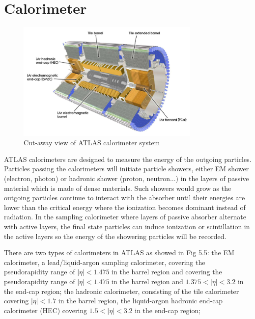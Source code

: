 \section{Calorimeter}
\label{sec:calo}
\begin{figure}[htbp]
 \begin{center}
 \includegraphics[width=0.8\textwidth]{chapters/c4/figures/Calo}
 \end{center}
 \caption{Cut-away view of ATLAS calorimeter system}
 \label{fig:Calo}
\end{figure}
\par ATLAS calorimeters \cite{CERN-LHCC-96-041} are designed to measure the energy of the outgoing particles. 
Particles passing the calorimeters will initiate particle showers, either EM shower (electron, photon) or hadronic shower (proton, neutron...) 
in the layers of passive material which is made of dense materials. Such showers would grow as the outgoing particles continue to interact with the absorber until their energies are lower than the critical energy where the ionization becomes dominant instead of radiation. In the sampling calorimeter where layers of passive absorber alternate with active layers, 
the final state particles can induce ionization or scintillation in the active layers so the energy of the showering particles will be recorded.
\par There are two types of calorimeters in ATLAS as showed in Fig 5.5: the EM calorimeter, a lead/liquid-argon sampling calorimeter, covering the pseudorapidity range of $|\eta| < 1.475$ in the barrel region and
covering the pseudorapidity range of $|\eta| < 1.475$ in the barrel region and $1.375 < |\eta| < 3.2$ in the end-cap region; the hadronic calorimeter, 
consisting of the tile calorimeter covering $|\eta| < 1.7$ in the barrel region, the liquid-argon hadronic end-cap calorimeter (HEC) covering $1.5 < |\eta| < 3.2$ in the end-cap region; 
